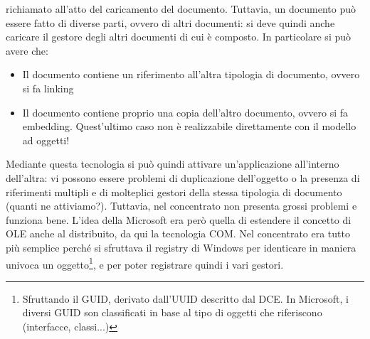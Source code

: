 richiamato all'atto del caricamento del documento.
Tuttavia, un documento può essere fatto di diverse parti, ovvero di altri documenti: si deve quindi anche caricare il 
gestore degli altri documenti di cui è composto. In particolare si può avere che:
\begin{itemize}
 \item Il documento contiene un riferimento all'altra tipologia di documento, ovvero si fa linking
 \item Il documento contiene proprio una copia dell'altro documento, ovvero si fa embedding. Quest'ultimo caso non è 
 realizzabile direttamente con il modello ad oggetti!
\end{itemize}
Mediante questa tecnologia si può quindi attivare un'applicazione all'interno dell'altra: vi possono essere problemi di 
duplicazione dell'oggetto o la presenza di riferimenti multipli e di molteplici gestori della stessa tipologia di 
documento (quanti ne attiviamo?). Tuttavia, nel concentrato non presenta grossi problemi e funziona bene.
L'idea della Microsoft era però quella di estendere il concetto di OLE anche al distribuito, da qui la tecnologia COM. 
Nel concentrato era tutto più semplice perché si sfruttava il registry di Windows per identicare in maniera univoca un
oggetto\footnote{Sfruttando il GUID, derivato dall'UUID descritto dal DCE. In Microsoft, i diversi GUID son classificati 
in base al tipo di oggetti che riferiscono (interfacce, classi...)}, e per poter registrare quindi i vari gestori.
